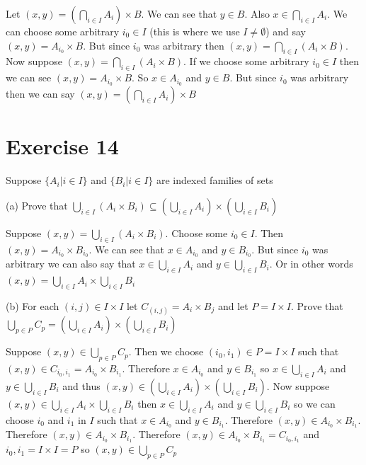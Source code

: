 \documentclass[11pt]{article}
\begin{document}
Let $(x, y) = (\bigcap_{i \in I} A_i) \times B$. We can see that $y \in B$. 
Also $x \in \bigcap_{i \in I} A_i$. We can choose some arbitrary $i_0 \in I$ 
(this is where we use $I \neq \emptyset$) and say 
$(x, y) = A_{i_0} \times B$. But since $i_0$ was arbitrary then 
$(x, y) = \bigcap_{i \in I} (A_i \times B)$. Now suppose 
$(x, y) = \bigcap_{i \in I} (A_i \times B)$. If we choose some arbitrary $i_0 \in I$
then we can see $(x, y) = A_{i_0} \times B$. So $x \in A_{i_0}$ and $y \in B$. But 
since $i_0$ was arbitrary then we can say $(x, y) = (\bigcap_{i \in I} A_i) \times B$

\section*{Exercise 14}

Suppose $\{A_i | i \in I\}$ and $\{B_i | i \in I\}$ are indexed families of sets 

\noindent (a) Prove that $\bigcup_{i \in I} (A_i \times B_i) \subseteq 
(\bigcup_{i \in I} A_i) \times (\bigcup_{i \in I} B_i)$

Suppose $(x, y) = \bigcup_{i \in I} (A_i \times B_i)$. Choose some $i_0 \in I$.
Then $(x, y) = A_{i_0} \times B_{i_0}$. We can see that $x \in A_{i_0}$ and 
$y \in B_{i_0}$. But since $i_0$ was arbitrary we can also say that 
$x \in \bigcup_{i \in I} A_i$ and $y \in \bigcup_{i \in I} B_i$. Or in other words 
$(x, y) = \bigcup_{i \in I} A_i \times \bigcup_{i \in I} B_i$

\noindent (b) For each $(i, j) \in I \times I$ let $C_{(i, j)} = A_i \times B_j$
and let $P = I \times I$. Prove that $\bigcup_{p \in P} C_p = (\bigcup_{i \in I} A_i) \times (\bigcup_{i \in I} B_i)$

Suppose $(x, y) \in \bigcup_{p \in P} C_p$. Then we choose $(i_0, i_1) \in P = I \times I$
such that $(x, y) \in C_{i_0, i_1} = A_{i_0} \times B_{i_1}$. Therefore $x \in A_{i_0}$
and $y \in B_{i_1}$ so $x \in \bigcup_{i \in I} A_i$ and $y \in \bigcup_{i \in I} B_i$
and thus $(x, y) \in (\bigcup_{i \in I} A_i) \times (\bigcup_{i \in I} B_i)$.
Now suppose $(x, y) \in \bigcup_{i \in I} A_i \times \bigcup_{i \in I} B_i$ then 
$x \in \bigcup_{i \in I} A_i$ and $y \in \bigcup_{i \in I} B_i$ so we can choose 
$i_0$ and $i_1$ in $I$ such that $x \in A_{i_0}$ and $y \in B_{i_1}$. Therefore 
$(x, y) \in A_{i_0} \times B_{i_1}$. Therefore $(x, y) \in A_{i_0} \times B_{i_1}$.
Therefore $(x, y) \in A_{i_0} \times B_{i_1} = C_{i_0, i_1}$ and $i_0, i_1 = I \times I = P$
so $(x, y) \in \bigcup_{p \in P} C_p$
\end{document}
